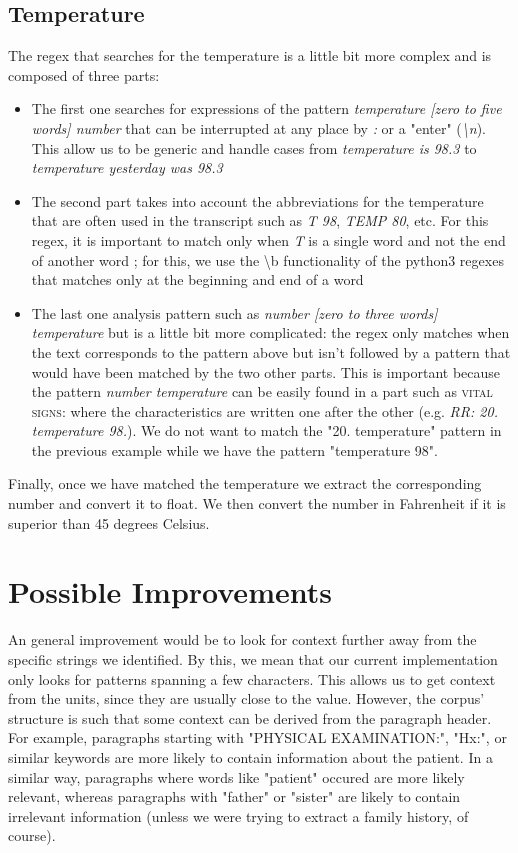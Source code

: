 \documentclass[10pt, a4paper, oneside]{article} %
\begin{document}
\subsection*{Temperature}

The regex that searches for the temperature is a little bit more complex and is composed of three parts: 
\begin{itemize}
\item The first one searches for expressions of the pattern \textit{temperature [zero to five words] number} that can be interrupted at any place by \textit{:} or a "enter" (\textit{\textbackslash n}). This allow us to be generic and handle cases from \textit{temperature is 98.3} to \textit{temperature yesterday was 98.3}
\item The second part takes into account the abbreviations for the temperature that are often used in the transcript such as \textit{T 98}, \textit{TEMP 80}, etc. For this regex, it is important to match only when \textit{T} is a single word and not the end of another word ; for this, we use the \textbackslash b functionality of the python3 regexes that matches only at the beginning and end of a word
\item The last one analysis pattern such as \textit{number [zero to three words] temperature} but is a little bit more complicated: the regex only matches when the text corresponds to the pattern above but isn't followed by a pattern that would have been matched by the two other parts. This is important because the pattern \textit{number temperature} can be easily found in a part such as \textsc{vital signs:} where the characteristics are written one after the other (e.g. \textit{RR: 20. temperature 98.}). We do not want to match the "20. temperature" pattern in the previous example while we have the pattern "temperature 98".
\end{itemize}

Finally, once we have matched the temperature we extract the corresponding number and convert it to float. We then convert the number in Fahrenheit if it is superior than 45 degrees Celsius. 

\section{Possible Improvements}
An general improvement would be to look for context further away from the specific strings we identified. By this, we mean that our current implementation only looks for patterns spanning a few characters. This allows us to get context from the units, since they are usually close to the value. However, the corpus' structure is such that some context can be derived from the paragraph header. For example, paragraphs starting with "PHYSICAL EXAMINATION:", "Hx:", or similar keywords are more likely to contain information about the patient. In a similar way, paragraphs where words like "patient" occured are more likely relevant, whereas paragraphs with "father" or "sister" are likely to contain irrelevant information (unless we were trying to extract a family history, of course).\\
\end{document}
